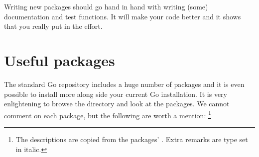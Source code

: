 \begin{lbar}
Writing new packages should go hand in hand with writing (some)
documentation and test functions. It will make your code better and it
shows that you really put in the effort.
\end{lbar}

\section{Useful packages}
The standard Go repository includes a huge number of packages and it is
even possible to install more along side your current Go installation. 
It is very enlightening to browse the  directory and
look at the packages.
We cannot comment on each package, but the following are worth a mention:
\footnote{The descriptions are copied from the packages' . Extra
remarks are type set in italic.}

